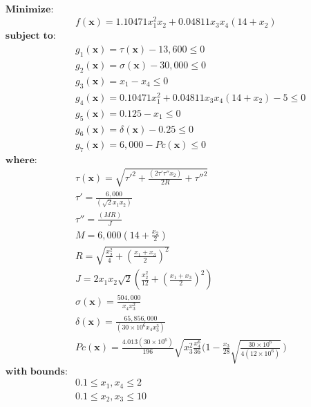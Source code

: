 \begin{align*}
\textbf{Minimize:} & \\
& f(\bm{x}) = 1.10471x_1^2x_2 + 0.04811x_3x_4(14 + x_2) \\[0.5em]
\textbf{subject to:} & \\
& g_1(\bm{x}) = \tau(\bm{x}) - 13,600 \leq 0 \\
& g_2(\bm{x}) = \sigma(\bm{x}) - 30,000 \leq 0 \\
& g_3(\bm{x}) = x_1 - x_4 \leq 0 \\
& g_4(\bm{x}) = 0.10471x_1^2 + 0.04811x_3x_4(14+x_2) - 5  \leq 0 \\
& g_5(\bm{x}) = 0.125 - x_1 \leq 0 \\
& g_6(\bm{x}) = \delta(\bm{x}) - 0.25 \leq 0 \\
& g_7(\bm{x}) = 6,000 - Pc(\bm{x}) \leq 0 \\[0.5em]
\textbf{where:} & \\
& \tau(\bm{x}) = \sqrt{\tau'^2 + \frac{(2 \tau' \tau'' x_2)}{2R} + \tau''^2 } \\
& \tau' = \frac{6,000}{(\sqrt{2} x_1 x_2)} \\[0.5em]
& \tau'' = \frac{(M R)}{J} \\
& M = 6,000 (14 + \frac{x_2}{2}) \\
& R = \sqrt{\frac{x_2^2}{4} + (\frac{x_1 + x_3}{2})^2} \\
& J = 2 x_1 x_2 \sqrt{2} (\frac{x_2^2}{12} + (\frac{x_1 + x_3}{2})^2) \\[0.5em]
& \sigma(\bm{x}) = \frac{504,000}{x_4 x_3^2} \\[0.5em]
& \delta(\bm{x}) = \frac{65,856,000}{(30 \times 10^6 x_4 x_3^3)} \\
& Pc(\bm{x}) = \frac{4.013(30 \times 10^6)}{196} \sqrt{x_3^2 \frac{x_4^6}{36}} \Bigg(1 - \frac{x_3}{28} \sqrt{\frac{30 \times 10^6}{4(12 \times 10^6)}} \, \Bigg) \\[0.5em]
\textbf{with bounds:} & \\
&  0.1 \leq x_1, x_4 \leq 2 \\
&  0.1 \leq x_2, x_3 \leq 10
\end{align*}